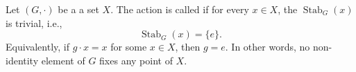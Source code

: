 \begin{definition} \label{definition:free_action_of_a_group_on_a_set}
Let $(G,\cdot)$ be a   a set $X$. The action is called  if for every $x \in X$, the  $\operatorname{Stab}_G(x)$ is trivial, i.e.,
$$\operatorname{Stab}_G(x) = \{e\}.$$
Equivalently, if $g \cdot x = x$ for some $x \in X$, then $g = e$. In other words, no non-identity element of $G$ fixes any point of $X$.
\end{definition}
